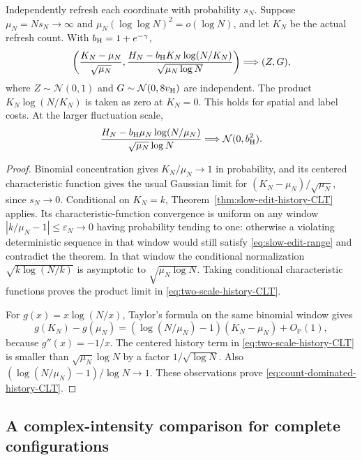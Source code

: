 \documentclass[11pt,letterpaper]{article}
\newcommand{\PP}{\mathbb P}\newcommand{\EE}{\mathbb E}
\begin{document}
\begin{corollary}
\label{cor:slow-independent-history-CLT}
Independently refresh each coordinate with probability $s_N$.
Suppose $\mu_N=Ns_N\to\infty$ and
$\mu_N(\log\log N)^2=o(\log N)$, and let $K_N$ be the actual
refresh count. With $b_{\rm H}=1+e^{-\gamma}$,
\begin{equation}\label{eq:two-scale-history-CLT}
 \left(\frac{K_N-\mu_N}{\sqrt{\mu_N}},
 \frac{H_N-b_{\rm H}K_N\log(N/K_N)}{\sqrt{\mu_N\log N}}\right)
       \Longrightarrow (Z,G),
\end{equation}
where $Z\sim\mathcal N(0,1)$ and
$G\sim\mathcal N(0,8v_{\rm H})$ are independent. The product
$K_N\log(N/K_N)$ is taken as zero at $K_N=0$.
This holds for spatial and label costs. At the larger fluctuation
scale,
\begin{equation}\label{eq:count-dominated-history-CLT}
 \frac{H_N-b_{\rm H}\mu_N\log(N/\mu_N)}
                    {\sqrt{\mu_N}\log N}
          \Longrightarrow\mathcal N(0,b_{\rm H}^2).
\end{equation}
\end{corollary}
\begin{proof}
Binomial concentration gives $K_N/\mu_N\to1$ in probability,
and its centered characteristic function gives the usual Gaussian
limit for $(K_N-\mu_N)/\sqrt{\mu_N}$, since $s_N\to0$.
Conditional on $K_N=k$, Theorem~\ref{thm:slow-edit-history-CLT}
applies. Its characteristic-function convergence is uniform on
any window $|k/\mu_N-1|\le\varepsilon_N\to0$ having probability
tending to one: otherwise a violating deterministic sequence in
that window would still satisfy \eqref{eq:slow-edit-range} and
contradict the theorem. In that window the conditional
normalization $\sqrt{k\log(N/k)}$ is asymptotic to
$\sqrt{\mu_N\log N}$. Taking conditional characteristic functions
proves the product limit in \eqref{eq:two-scale-history-CLT}.

For $g(x)=x\log(N/x)$, Taylor's formula on the same binomial
window gives
\[
 g(K_N)-g(\mu_N)
   =(\log(N/\mu_N)-1)(K_N-\mu_N)+O_{\PP}(1),
\]
because $g''(x)=-1/x$. The centered history term in
\eqref{eq:two-scale-history-CLT} is smaller than
$\sqrt{\mu_N}\log N$ by a factor $1/\sqrt{\log N}$.
Also $(\log(N/\mu_N)-1)/\log N\to1$.
These observations prove \eqref{eq:count-dominated-history-CLT}.
\end{proof}

\subsection{A complex-intensity comparison for complete configurations}
\label{sec:complex-coefficient-rate}
\end{document}
